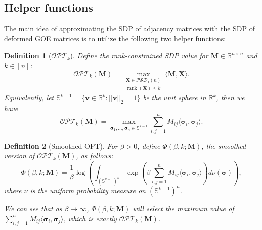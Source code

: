 \documentclass[11pt, titlepage]{article} %
\numberwithin{equation}{section}
\newtheorem{definition}{Definition}
\theoremstyle{definition}
\numberwithin{theorem}{section}
\numberwithin{lemma}{section}
\numberwithin{corollary}{section}
\numberwithin{proposition}{section}
\numberwithin{definition}{section}
\numberwithin{remark}{section}
\begin{document}
\subsection{Helper functions}
\label{sec:sdp.helper}
The main idea of approximating the SDP of adjacency matrices with the SDP of deformed GOE matrices
is to utilize the following two helper functions:
\begin{definition}[$\mathcal{OPT}_k$]
Define the rank-constrained SDP value for $\bm{M} \in \mathbb{R}^{n\times n}$ and $k \in [n]$:
\[
\mathcal{OPT}_k(\bm{M}) = \max_{\substack{\bm{X} \in \mathcal{PSD}_1(n)\\
\operatorname{rank}(\bm{X}) \leq k}} \langle \bm{M}, \bm{X} \rangle.
\]
Equivalently, let $\mathbb{S}^{k-1} = \{\bm{v} \in \mathbb{R}^k: ||\bm{v}||_2 = 1\}$ be the unit sphere
in $\mathbb{R}^k$, then we have
\[
\mathcal{OPT}_k(\bm{M}) = \max_{\bm{\sigma}_1, \dots, \bm{\sigma}_n \in \mathbb{S}^{k-1}}
\sum_{i,j=1}^n M_{ij} \langle \bm{\sigma}_i, \bm{\sigma}_j \rangle.
\]
\end{definition}
\begin{definition}[Smoothed OPT]
For $\beta > 0$, define $\Phi(\beta, k; \bm{M})$, the smoothed version of $\mathcal{OPT}_k(\bm{M})$,
as follows:
\[
\Phi(\beta, k; \bm{M}) = \frac{1}{\beta} \log \left(\int_{(\mathbb{S}^{k-1})^n} \exp\left(\beta \sum_{i,j=1}^n M_{ij}
\langle \bm{\sigma}_i, \bm{\sigma}_j \rangle\right) d\nu(\bm{\sigma})\right),
\]
where $\nu$ is the uniform probability measure on $(\mathbb{S}^{k-1})^n$.

We can see that as $\beta \to \infty$, $\Phi(\beta, k; \bm{M})$ will select the maximum value of
$\sum_{i,j=1}^n M_{ij} \langle \bm{\sigma}_i, \bm{\sigma}_j \rangle$, which is exactly $\mathcal{OPT}_k(\bm{M})$.
\end{definition}
\end{document}
